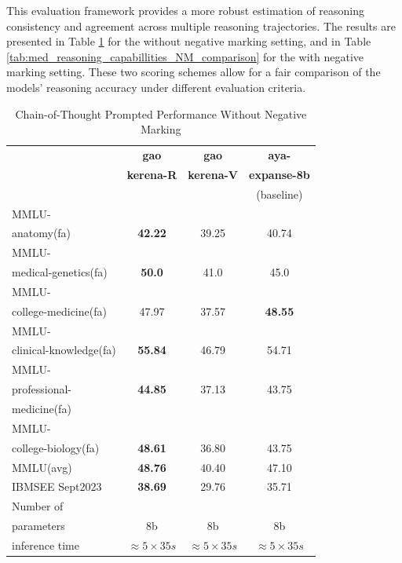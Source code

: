 \documentclass[conference]{IEEEtran}
\begin{document}
This evaluation framework provides a more robust estimation of reasoning consistency and agreement across multiple reasoning trajectories. The results are presented in Table
\ref{tab:med_reasoning_capabillities_WNM_comparison}
 for the without negative marking setting, and in Table
\ref{tab:med_reasoning_capabillities_NM_comparison}
 for the with negative marking setting. These two scoring schemes allow for a fair comparison of the models’ reasoning accuracy under different evaluation criteria.


	\begin{table}[ht]
		\centering
		\caption{Chain-of-Thought Prompted Performance Without Negative Marking}
		\begin{tabular}{|l|c|c|c|}  
			\hline
			\textbf{} & \textbf{gao} & \textbf{gao} & \textbf{aya-} \\ 
			& \textbf{kerena-R} &  \textbf{kerena-V} & \textbf{expanse-8b} \\
			&   & &(baseline)  \\ \hline
			MMLU- &  &  &  \\ 
			anatomy(fa)  & \textbf{42.22} & 39.25  & 40.74 \\ \hline
			MMLU- &    &  &  \\
			medical-genetics(fa) & \textbf{50.0}  & 41.0  & 45.0 \\ \hline
			MMLU- &  &    &  \\
			college-medicine(fa) & 47.97  & 37.57  &\textbf{48.55}  \\ \hline
			MMLU- &    &  &  \\
			clinical-knowledge(fa)& \textbf{55.84} & 46.79  & 54.71  \\ \hline
			MMLU- &  &  &  \\
			professional-& \textbf{44.85} & 37.13 & 43.75 \\
                        medicine(fa)& &  &  \\ \hline
			MMLU- &  &  &  \\
			college-biology(fa)& \textbf{48.61} & 36.80 & 43.75 \\ \hline
			MMLU(avg) & \textbf{48.76} & 40.40 & 47.10 \\ \hline
			IBMSEE Sept2023 & \textbf{38.69}  & 29.76 & 35.71  \\ \hline
			Number of&  &  &  \\
			parameters & 8b & 8b & 8b \\ \hline
			inference time & $\approx 5 \times 35s$ & $\approx 5 \times 35s$ & $\approx 5 \times 35s$ \\  \hline
		\end{tabular}
		\label{tab:med_reasoning_capabillities_WNM_comparison}
	\end{table}
\end{document}
